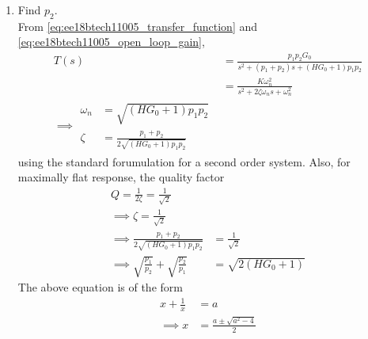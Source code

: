 \begin{enumerate}[label=\arabic*.,ref=\theenumi]
\item Find $p_2$.
\\
\solution From \eqref{eq:ee18btech11005_transfer_function} and \eqref{eq:ee18btech11005_open_loop_gain},
\begin{align}
    T(s) &= \frac{p_1p_2G_0}{s^2+(p_1+p_2)s+(HG_0+1)p_1p_2} \label{eq:ee18btech11005_closed_loop}
\\
&= \frac{K \omega_n^{2}}{s^2+2\zeta\omega_ns+\omega_n^{2}}
\\
\implies 
\begin{split}
    \omega_n &= \sqrt{(HG_0+1)p_1p_2}\\
    \zeta &= \frac{p_1+p_2}{2\sqrt{(HG_0+1)p_1p_2}}
\end{split}
\label{eq:ee18btech11005_second_order_zeta}
\end{align}
using the standard forumulation for a second order system.  Also, for maximally flat response, the quality factor 
\begin{align}
    Q = \frac{1}{2\zeta}= \frac{1}{\sqrt{2}}&
\\
\implies  \zeta = \frac{1}{\sqrt{2}} &
\label{eq:ee18btech11005_second_order_zeta_q}
\\
\implies \frac{p_1+p_2}{2\sqrt{(HG_0+1)p_1p_2}} &= \frac{1}{\sqrt{2}}
\\
\implies \sqrt{\frac{p_1}{p_2}}+\sqrt{\frac{p_2}{p_1}} 
&= \sqrt{2(HG_0+1)} 
\end{align}
%
The above equation is of the form 
%
\begin{align}
\label{eq:ee18btech11005_x}
x + \frac{1}{x} &= a
\\
\implies x &= \frac{a \pm \sqrt{a^2 -4}}{2}

\end{align}
\end{enumerate}
